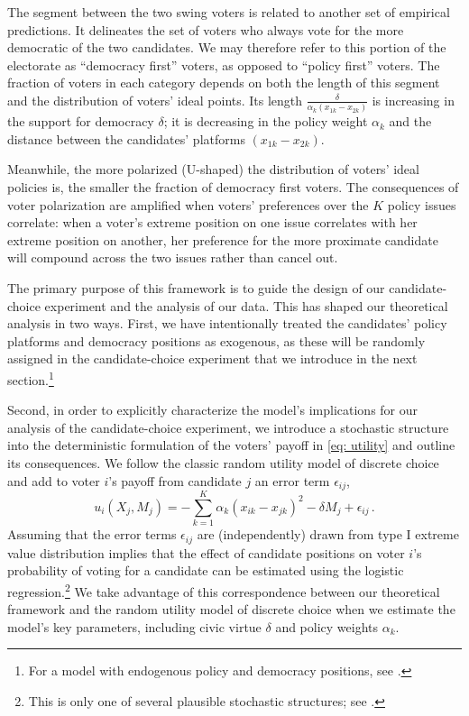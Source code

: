 \documentclass[letterpaper, 12pt]{article}
\begin{document}
\begin{raggedright}
The segment between the two swing voters is related to another set of empirical predictions. It delineates the set of voters who always vote for the more democratic of the two candidates. We may therefore refer to this portion of the electorate as ``democracy first'' voters, as opposed to ``policy first'' voters. The fraction of voters in each category depends on both the length of this segment and the distribution of voters’ ideal points. Its length $\frac{\delta}{\alpha_k (x_{1k} - x_{2k})}$ is increasing in the support for democracy $\delta$; it is decreasing in the policy weight $\alpha_k$ and the distance between the candidates' platforms $(x_{1k} - x_{2k})$.

Meanwhile, the more polarized (U-shaped) the distribution of voters' ideal policies is, the smaller the fraction of democracy first voters. The consequences of voter polarization are amplified when voters' preferences over the $K$ policy issues correlate: when a voter's extreme position on one issue correlates with her extreme position on another, her preference for the more proximate candidate will compound across the two issues rather than cancel out.

The primary purpose of this framework is to guide the design of our candidate-choice experiment and the analysis of our data. This has shaped our theoretical analysis in two ways. First, we have intentionally treated the candidates' policy platforms and democracy positions as exogenous, as these will be randomly assigned in the candidate-choice experiment that we introduce in the next section.\footnote{For a model with endogenous policy and democracy positions, see \citet{Svolik2019}.}

Second, in order to explicitly characterize the model's implications for our analysis of the candidate-choice experiment, we introduce a stochastic structure into the deterministic formulation of the voters' payoff in \eqref{eq: utility} and outline its consequences. We follow the classic random utility model of discrete choice and add to voter $i$'s payoff from candidate $j$ an error term $\epsilon_{ij}$,
\begin{equation}
\label{eq: random utility}
u_i(X_j, M_j) = -\sum\limits_{k=1}^K \alpha_k (x_{ik} - x_{jk})^2 - \delta M_j + \epsilon_{ij}\, .
\end{equation}
Assuming that the error terms $\epsilon_{ij}$ are (independently) drawn from type I extreme value distribution implies that the effect of candidate positions on voter $i$'s probability of voting for a candidate can be estimated using the logistic regression.\footnote{This is only one of several plausible stochastic structures; see \citet[476-478, 486-487]{Cameron2005}.} We take advantage of this correspondence between our theoretical framework and the random utility model of discrete choice when we estimate the model's key parameters, including civic virtue $\delta$ and policy weights $\alpha_k$.


\end{raggedright}
\end{document}
